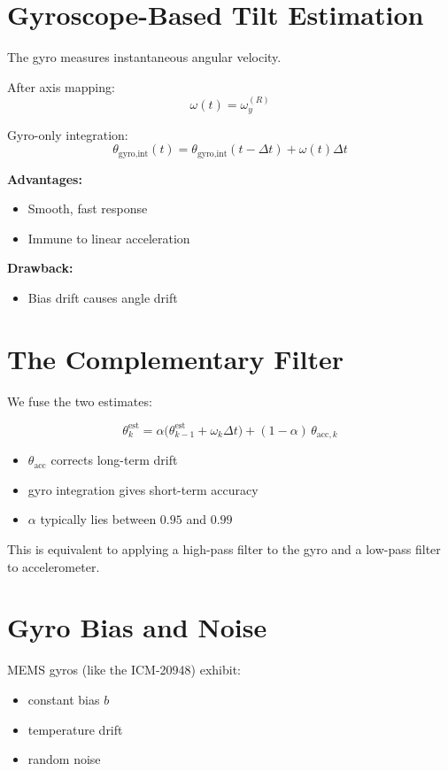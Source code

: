 \documentclass[11pt,a4paper]{article}
\begin{document}
\section{Gyroscope-Based Tilt Estimation}

The gyro measures instantaneous angular velocity. 


After axis mapping:
\[
\omega(t) = \omega_y^{(R)}
\]

Gyro-only integration:
\[
\theta_{\text{gyro,int}}(t)
=
\theta_{\text{gyro,int}}(t-\Delta t)
+
\omega(t)\Delta t
\]

\textbf{Advantages:}
\begin{itemize}
    \item Smooth, fast response
    \item Immune to linear acceleration
\end{itemize}

\textbf{Drawback:}
\begin{itemize}
    \item Bias drift causes angle drift
\end{itemize}

\section{The Complementary Filter}

We fuse the two estimates:

\[
\boxed{
\theta_k^{\text{est}}
=
\alpha\big(\theta_{k-1}^{\text{est}} + \omega_k \Delta t\big)
+
(1-\alpha)\,\theta_{\text{acc},k}
}
\]

\begin{itemize}
    \item $\theta_{\text{acc}}$ corrects long-term drift
    \item gyro integration gives short-term accuracy
    \item $\alpha$ typically lies between $0.95$ and $0.99$
\end{itemize}

This is equivalent to applying a high-pass filter to the gyro and a low-pass filter to accelerometer. 

\section{Gyro Bias and Noise}

MEMS gyros (like the ICM-20948) exhibit:
\begin{itemize}
    \item constant bias $b$
    \item temperature drift
    \item random noise
\end{itemize}
\end{document}
